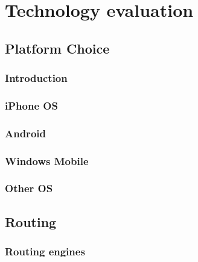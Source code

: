 \documentclass[11pt,a4paper]{scrreprt}
\begin{document}
\chapter{Technology evaluation} %

	\section{Platform Choice} %
	\label{chp:platform_choice}

	\subsection{Introduction} %
	\label{sec:platform_introduction}
	

	\subsection{iPhone OS} %
	\label{sec:iphone}
	

	\subsection{Android} %
	\label{sec:android_plattform_choice}
	

	\subsection{Windows Mobile} %
	\label{sec:win_mobile}
	

	\subsection{Other OS} %
	\label{sec:other_os}
	
	
	\section{Routing} %
	\label{sec:android_routing}
	
	
	\subsection{Routing engines}
	\label{sub:routing_engines}
	
	
\end{document}

